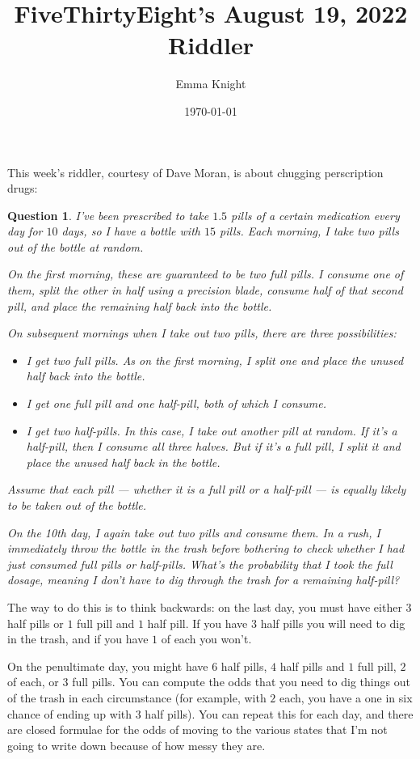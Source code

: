 \documentclass[11pt]{article}
\title{FiveThirtyEight's August 19, 2022 Riddler}
\author{Emma Knight}
\date{\today}
\newtheorem{question}[theorem]{Question}
\theoremstyle{definition}
\begin{document}
\maketitle
This week's riddler, courtesy of Dave Moran, is about chugging perscription drugs:
\begin{question}
I've been prescribed to take $1.5$ pills of a certain medication every day for $10$ days, so I have a bottle with $15$ pills. Each morning, I take two pills out of the bottle at random.

On the first morning, these are guaranteed to be two full pills. I consume one of them, split the other in half using a precision blade, consume half of that second pill, and place the remaining half back into the bottle.

On subsequent mornings when I take out two pills, there are three possibilities:
\begin{itemize}
\item I get two full pills. As on the first morning, I split one and place the unused half back into the bottle.
\item I get one full pill and one half-pill, both of which I consume.
\item I get two half-pills. In this case, I take out another pill at random. If it’s a half-pill, then I consume all three halves. But if it’s a full pill, I split it and place the unused half back in the bottle.
\end{itemize}
Assume that each pill — whether it is a full pill or a half-pill — is equally likely to be taken out of the bottle.

On the 10th day, I again take out two pills and consume them. In a rush, I immediately throw the bottle in the trash before bothering to check whether I had just consumed full pills or half-pills. What’s the probability that I took the full dosage, meaning I don’t have to dig through the trash for a remaining half-pill?
\end{question}
The way to do this is to think backwards: on the last day, you must have either $3$ half pills or $1$ full pill and $1$ half pill.  If you have $3$ half pills you will need to dig in the trash, and if you have $1$ of each you won't.

On the penultimate day, you might have $6$ half pills, $4$ half pills and $1$ full pill, $2$ of each, or $3$ full pills.  You can compute the odds that you need to dig things out of the trash in each circumstance (for example, with $2$ each, you have a one in six chance of ending up with $3$ half pills).  You can repeat this for each day, and there are closed formulae for the odds of moving to the various states that I'm not going to write down because of how messy they are.
\end{document}
